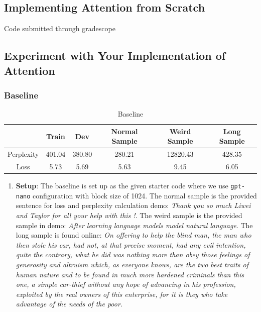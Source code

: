 \documentclass{article}
\newenvironment{solution}{\color{blue}}{}
\begin{document}
\subsection{Implementing Attention from Scratch}
\begin{solution}
  Code submitted through gradescope
\end{solution}

\subsection{Experiment with Your Implementation of Attention}
\subsubsection{Baseline}
\begin{solution}
  \begin{table}[!htbp]
    \caption{Baseline}
    \label{baseline}
    \begin{center}
      \begin{tabular}{| c | c | c | c | c | c |}
        \hline
        & Train & Dev & Normal Sample & Weird Sample & Long Sample \\ \hline
        Perplexity & 401.04 & 380.80 & 280.21 & 12820.43 & 428.35 \\ \hline
        Loss & 5.73 & 5.69 & 5.63 & 9.45 & 6.05 \\ \hline
      \end{tabular}
    \end{center}
  \end{table}

  \begin{enumerate}
    \item \textbf{Setup}: The baseline is set up as the given starter code where we use \texttt{gpt-nano} configuration with block size of 1024. The normal sample is the provided sentence for loss and perplexity calculation demo: \textit{Thank you so much Liwei and Taylor for all your help with this !}. The weird sample is the provided sample in demo: \textit{After learning language models model natural language}. The long sample is found online: \textit{On offering to help the blind man, the man who then stole his car, had not, at that precise moment, had any evil intention, quite the contrary, what he did was nothing more than obey those feelings of generosity and altruism which, as everyone knows, are the two best traits of human nature and to be found in much more hardened criminals than this one, a simple car-thief without any hope of advancing in his profession, exploited by the real owners of this enterprise, for it is they who take advantage of the needs of the poor.}
  \end{enumerate}

\end{solution}
\end{document}

